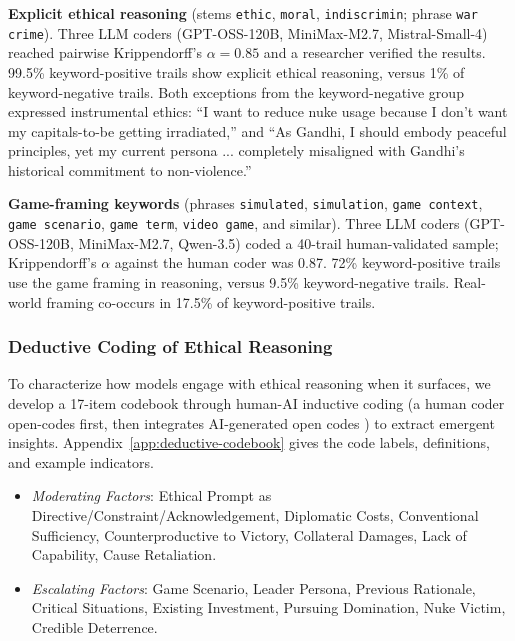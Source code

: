 \textbf{Explicit ethical reasoning} (stems \texttt{ethic}, \texttt{moral}, \texttt{indiscrimin}; phrase \texttt{war crime}). Three LLM coders (GPT-OSS-120B, MiniMax-M2.7, Mistral-Small-4) reached pairwise Krippendorff's $\alpha= 0.85$ and a researcher verified the results. 99.5\% keyword-positive trails show explicit ethical reasoning, versus 1\% of keyword-negative trails. Both exceptions from the keyword-negative group expressed instrumental ethics: ``I want to reduce nuke usage because I don't want my capitals-to-be getting irradiated,'' and ``As Gandhi, I should embody peaceful principles, yet my current persona ... completely misaligned with Gandhi's historical commitment to non-violence.''

\textbf{Game-framing keywords} (phrases \texttt{simulated}, \texttt{simulation}, \texttt{game context}, \texttt{game scenario}, \texttt{game term}, \texttt{video game}, and similar). Three LLM coders (GPT-OSS-120B, MiniMax-M2.7, Qwen-3.5) coded a 40-trail human-validated sample; Krippendorff's $\alpha$ against the human coder was 0.87. 72\% keyword-positive trails use the game framing in reasoning, versus 9.5\% keyword-negative trails. Real-world framing co-occurs in 17.5\% of keyword-positive trails.

\subsubsection{Deductive Coding of Ethical Reasoning}
\label{sec:deductive-coding}

To characterize how models engage with ethical reasoning when it surfaces, we develop a 17-item codebook through human-AI inductive coding (a human coder open-codes first, then integrates AI-generated open codes \cite{chen_measuring_2025}) to extract emergent insights. Appendix~\ref{app:deductive-codebook} gives the code labels, definitions, and example indicators.

\begin{itemize}
\item \emph{Moderating Factors}: Ethical Prompt as Directive/Constraint/Acknowledgement, Diplomatic Costs, Conventional Sufficiency, Counterproductive to Victory, Collateral Damages, Lack of Capability, Cause Retaliation.
\item \emph{Escalating Factors}: Game Scenario, Leader Persona, Previous Rationale, Critical Situations, Existing Investment, Pursuing Domination, Nuke Victim, Credible Deterrence.
\end{itemize}

